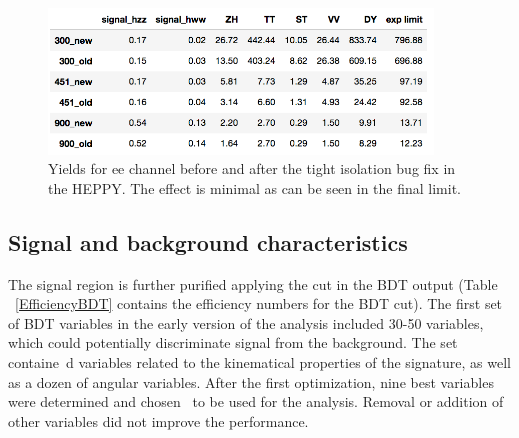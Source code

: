 \begin{figure}[tbp]
  \begin{center}
    \includegraphics[width=0.91\textwidth]{figures/ee_yields.png}
    \caption{Yields for ee channel before and after the tight isolation bug fix in the HEPPY. The effect is minimal as can be seen in the final limit. }
    \label{fig:yields_ee}
  \end{center}
\end{figure}



\subsection{Signal and background characteristics}

The signal region is further purified applying the cut in the BDT
output (Table ~\ref{EfficiencyBDT} contains the efficiency numbers for the BDT cut). 
The first set of BDT variables in the early version of the analysis included 30-50 variables, which could potentially discriminate signal from the background. The set containe\
d variables related to the kinematical properties of the signature, as well as a dozen of angular variables. After the first optimization, nine best variables were determined and chosen \
to be used for the analysis. Removal or addition of other variables did not improve the performance. %


